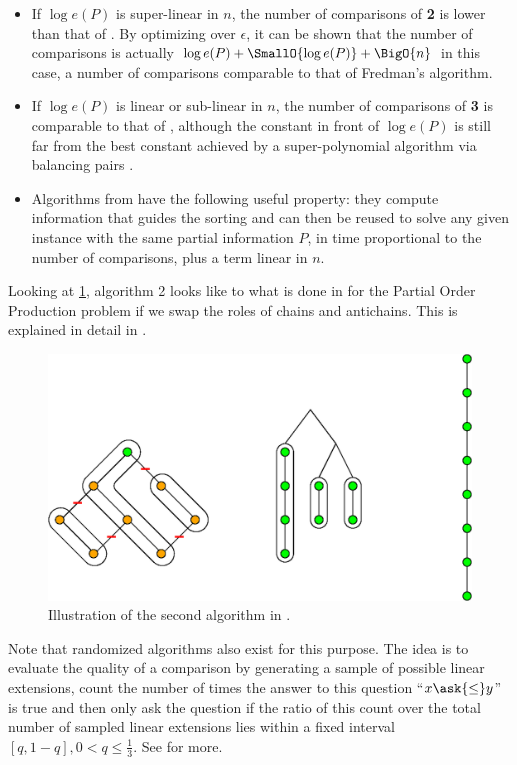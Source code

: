 \begin{itemize}

\item If $\log e(P)$ is super-linear in $n$, the number of comparisons of
\cite{cardinal2013sorting} \textbf{2} is lower than that of \cite{kahn:1995}. By
optimizing over $\epsilon$, it can be shown that the number of comparisons is
actually $\log e(P) + \SmallO{\log e(P)} + \BigO{n}$ in this case, a number of
comparisons comparable to that of Fredman’s algorithm.

\item If $\log e(P)$ is linear or sub-linear in $n$, the number of comparisons
of \cite{cardinal2013sorting} \textbf{3} is comparable to that of
\cite{kahn:1995}, although the constant in front of $\log e(P)$ is still far
from the best constant achieved by a super-polynomial algorithm via balancing
pairs \cite{brightwell1995balancing, brightwell1999balanced}.

\item Algorithms from \cite{cardinal2013sorting} have the following useful
property: they compute information that guides the sorting and can then be
reused to solve any given instance with the same partial information $P$, in
time proportional to the number of comparisons, plus a term linear in $n$.

\end{itemize}


Looking at \ref{fig:supi/alg2}, algorithm 2 looks like to what is done in
\cite{cardinal:2010} for the Partial Order Production problem if we swap the roles
of chains and antichains. This is explained in detail in
\cite{DBLP:conf/birthday/CardinalF13}.


\begin{figure}
	\centering
	\includegraphics[height=0.2\textheight]{fig/supi/reduction:diag}
	\caption{\label{fig:supi/alg2} Illustration of the second algorithm in
\cite{cardinal2013sorting}.}
\end{figure}


Note that randomized algorithms also exist for this purpose. The idea is to
evaluate the quality of a comparison by generating a sample of possible linear
extensions, count the number of times the answer to this question ``$x
\ask{\le} y$'' is true and then only ask the question if the ratio of
this count over the total number of sampled linear extensions lies within a
fixed interval $[q, 1-q], 0 < q \le \frac{1}{3}$. See \cite{huber2006fast} for
more.

